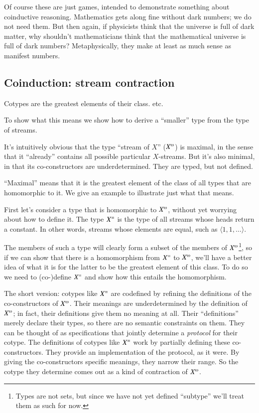 \documentclass{article}
\begin{document}
Of course these are just games, intended to demonstrate something
about coinductive reasoning. Mathematics gets along fine without dark
numbers; we do not need them. But then again, if physicists think that
the universe is full of dark matter, why shouldn't mathematicians
think that the mathematical universe is full of dark numbers?
Metaphysically, they make at least as much sense as manifest numbers.

\subsection{Coinduction: stream contraction}

Cotypes are the greatest elements of their class.  etc.

To show what this means we show how to derive a ``smaller'' type from
the type of streams.

It's intuitively obvious that the type ``stream of \(X\)''
(\(\colist{X}\)) is maximal, in the sense that it ``already'' contains
all possible particular \(X\)-streams. But it's also minimal, in that
its co-constructors are underdetermined. They are typed, but not
defined.

``Maximal'' means that it is the greatest element of the class of all
types that are homomorphic to it. We give an example to illustrate
just what that means.

First let's consider a type that is homomorphic to \(\colist{X}\),
without yet worrying about how to define it. The type
\({X^{=}}\) is the type of all streams whose heads return a
constant. In other words, streams whose elements are equal, such as
\(\langle 1,1,\ldots\rangle\).

The members of such a type will clearly form a subset of the members
of \(\colist{X}\)\footnote{Types are not sets, but since we have not
yet defined ``subtype'' we'll treat them as such for now.}, so if we
can show that there is a homomorphism from \({X^{=}}\) to
\(\colist{X}\), we'll have a better idea of what it is for the latter
to be the greatest element of this class. To do so we need to
(co-)define \({X^{=}}\) and show how this entails the
homomorphism.

The short version: cotypes like \({X^{=}}\) are codefined by
refining the definitions of the co-constructors of \(\colist{X}\).
Their meanings are underdetermined by the definition of
\(\colist{X}\); in fact, their definitions give them no meaning at
all. Their ``definitions'' merely declare their types, so there are no
semantic constraints on them. They can be thought of as specifications
that jointly determine a \textit{protocol} for their cotype. The
definitions of cotypes like \({X^{=}}\) work by partially
defining these co-constructors. They provide an implementation of the
protocol, as it were. By giving the co-constructors specific meanings,
they narrow their range. So the cotype they determine comes out as a
kind of contraction of \(\colist{X}\).
\end{document}
